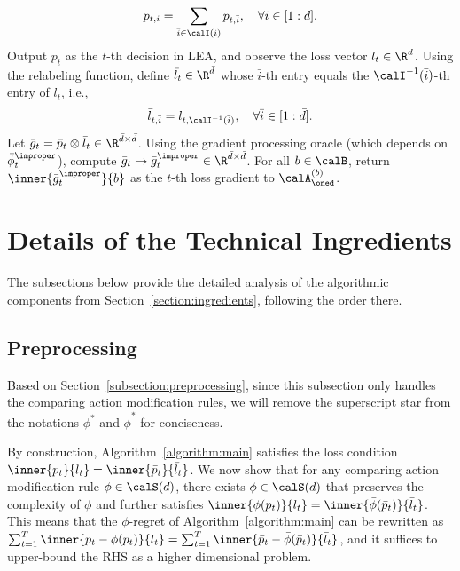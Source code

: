 \documentclass[10pt]{article}
\begin{document}
\begin{algorithm*}[!ht]
\begin{algorithmic}[1]
\begin{equation*}
p_{t,i}=\sum_{\bar i\in\calI(i)}\bar p_{t,\bar i}, \quad \forall i\in[1:d].
\end{equation*}
\STATE Output $p_t$ as the $t$-th decision in LEA, and observe the loss vector $l_t\in\R^d$. 
\STATE Using the relabeling function, define $\bar l_t\in\R^{\bar d}$ whose $\bar i$-th entry equals the $\calI^{-1}(\bar i)$-th entry of $l_t$, i.e., 
\begin{equation*}
\bar l_{t,\bar i}=l_{t,\calI^{-1}(\bar i)},\quad\forall \bar i\in[1:\bar d].
\end{equation*}
\STATE Let $\bar g_t=\bar p_t\otimes \bar l_t\in\R^{\bar d\times\bar d}$. 
\STATE Using the gradient processing oracle (which depends on $\bar \phi^\improper_t$), compute $\bar g_t\rightarrow\bar g_t^\improper\in\R^{\bar d\times\bar d}$.
\STATE For all $b\in\calB$, return $\inner{\bar g_t^\improper}{b}$ as the $t$-th loss gradient to $\calA_{\oned}^{(b)}$.
\ENDFOR
\end{algorithmic}
\end{algorithm*}

\section{Details of the Technical Ingredients}\label{section:detail_ingredients}

The subsections below provide the detailed analysis of the algorithmic components from Section~\ref{section:ingredients}, following the order there.

\subsection{Preprocessing}

Based on Section~\ref{subsection:preprocessing}, since this subsection only handles the comparing action modification rules, we will remove the superscript star from the notations $\phi^*$ and $\bar\phi^*$ for conciseness. 

By construction, Algorithm~\ref{algorithm:main} satisfies the loss condition $\inner{p_t}{l_t}=\inner{\bar p_t}{\bar l_t}$. We now show that for any comparing action modification rule $\phi\in\calS(d)$, there exists $\bar \phi\in\calS(\bar d)$ that preserves the complexity of $\phi$ and further satisfies $\inner{\phi(p_t)}{l_t}=\inner{\bar \phi(\bar p_t)}{\bar l_t}$. This means that the $\phi$-regret of Algorithm~\ref{algorithm:main} can be rewritten as $\sum_{t=1}^T\inner{p_t-\phi(p_t)}{l_t}=\sum_{t=1}^T\inner{\bar p_t-\bar \phi(\bar p_t)}{\bar l_t}$, and it suffices to upper-bound the RHS as a higher dimensional problem. 
\end{document}
